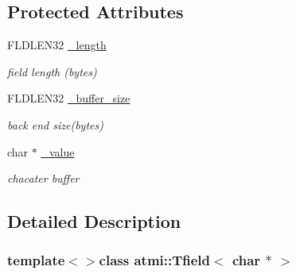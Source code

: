 \subsection*{Protected Attributes}
\begin{DoxyCompactItemize}
\item 
\hypertarget{classatmi_1_1_tfield_3_01char_01_5_01_4_aa25bb2aa5ab92371fb9b68f0659ced31}{F\+L\+D\+L\+E\+N32 \hyperlink{classatmi_1_1_tfield_3_01char_01_5_01_4_aa25bb2aa5ab92371fb9b68f0659ced31}{\+\_\+length}}\label{classatmi_1_1_tfield_3_01char_01_5_01_4_aa25bb2aa5ab92371fb9b68f0659ced31}

\begin{DoxyCompactList}\small\item\em field length (bytes) \end{DoxyCompactList}\item 
\hypertarget{classatmi_1_1_tfield_3_01char_01_5_01_4_a5e7218b977e644a60ed6fbb5d1957e75}{F\+L\+D\+L\+E\+N32 \hyperlink{classatmi_1_1_tfield_3_01char_01_5_01_4_a5e7218b977e644a60ed6fbb5d1957e75}{\+\_\+buffer\+\_\+size}}\label{classatmi_1_1_tfield_3_01char_01_5_01_4_a5e7218b977e644a60ed6fbb5d1957e75}

\begin{DoxyCompactList}\small\item\em back end size(bytes) \end{DoxyCompactList}\item 
\hypertarget{classatmi_1_1_tfield_3_01char_01_5_01_4_a425204246b56c8e10459b53b563800c9}{char $\ast$ \hyperlink{classatmi_1_1_tfield_3_01char_01_5_01_4_a425204246b56c8e10459b53b563800c9}{\+\_\+value}}\label{classatmi_1_1_tfield_3_01char_01_5_01_4_a425204246b56c8e10459b53b563800c9}

\begin{DoxyCompactList}\small\item\em chacater buffer \end{DoxyCompactList}\end{DoxyCompactItemize}


\subsection{Detailed Description}
\subsubsection*{template$<$$>$class atmi\+::\+Tfield$<$ char $\ast$ $>$}



